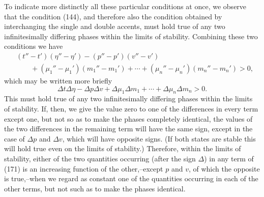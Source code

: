 \documentclass[11pt]{article}
\newcommand{\D}{\Delta}
\begin{document}
To indicate more distinctly all these particular conditions at once, we observe that the condition (144), and therefore also the condition obtained by interchanging the single and double accents, must hold true of any two infinitesimally differing phases within the limits of stability. Combining these two conditions we have
\begin{equation}
\begin{aligned}
&(t''-t')(\eta''-\eta')-(p''-p')(v''-v')\\
&\qquad{}+(\mu_1''-\mu_1')(m_1''-m_1')+\cdots+(\mu_n''-\mu_n')(m_n''-m_n')>0,
\end{aligned}
\end{equation}
which may be written more briefly
\begin{equation}
\D t\D\eta-\D p\D v+\D\mu_1\D m_1+\cdots+\D\mu_n\D m_n>0.
\end{equation}
This must hold true of any two infinitesimally differing phases within the limits of stability. If, then, we give the value zero to one of the differences in every term except one, but not so as to make the phases completely identical, the values of the two differences in the remaining term will have the same sign, except in the case of $\D p$ and $\D v$, which will have opposite signs. (If both states are stable this will hold true even on the limits of stability.) Therefore, within the limits of stability, either of the two quantities occurring (after the sign $\D$) in any term of (171) is an increasing function of the other,--except $p$ and $v$, of which the opposite is true,--when we regard as constant one of the quantities occurring in each of the other terms, but not such as to make the phases identical.
\end{document}
